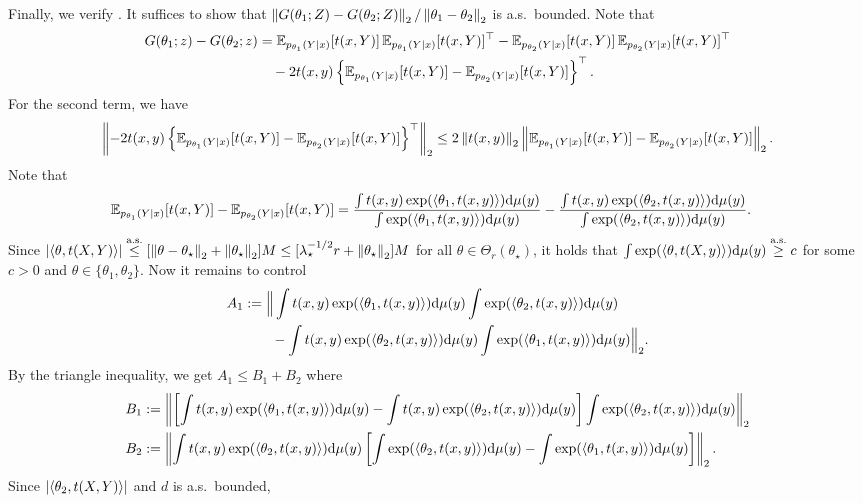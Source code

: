 \begin{example}
    Finally, we verify .
    It suffices to show that $\left\lVert G(\theta_1; Z) - G(\theta_2; Z) \right\rVert_2 / \left\lVert \theta_1 - \theta_2 \right\rVert_2$ is a.s.~bounded.
    Note that
    \begin{align*}
        G(\theta_1; z) - G(\theta_2; z)
        &= \operatorname{\mathbb E}_{p_{\theta_1}(Y \mid x)}[t(x, Y)] \operatorname{\mathbb E}_{p_{\theta_1}(Y \mid x)}[t(x, Y)]^\top - \operatorname{\mathbb E}_{p_{\theta_2}(Y \mid x)}[t(x, Y)] \operatorname{\mathbb E}_{p_{\theta_2}(Y \mid x)}[t(x, Y)]^\top \\
        &\quad - 2t(x, y)\left\{ \operatorname{\mathbb E}_{p_{\theta_1}(Y \mid x)}[t(x, Y)] - \operatorname{\mathbb E}_{p_{\theta_2}(Y \mid x)}[t(x, Y)] \right\}^\top.
    \end{align*}
    For the second term, we have
    \begin{align*}
        \left\lVert -2t(x, y)\left\{ \operatorname{\mathbb E}_{p_{\theta_1}(Y \mid x)}[t(x, Y)] - \operatorname{\mathbb E}_{p_{\theta_2}(Y \mid x)}[t(x, Y)] \right\}^\top \right\rVert_2
        \le 2\left\lVert t(x, y) \right\rVert_2 \left\lVert \operatorname{\mathbb E}_{p_{\theta_1}(Y \mid x)}[t(x, Y)] - \operatorname{\mathbb E}_{p_{\theta_2}(Y \mid x)}[t(x, Y)] \right\rVert_2.
    \end{align*}
    Note that
    \begin{align*}
        \operatorname{\mathbb E}_{p_{\theta_1}(Y \mid x)}[t(x, Y)] - \operatorname{\mathbb E}_{p_{\theta_2}(Y \mid x)}[t(x, Y)]
        &= \frac{\int t(x, y) \exp({\langle \theta_1, t(x, y) \rangle}) \mathrm{d} \mu(y)}{\int \exp({\langle \theta_1, t(x, y) \rangle}) \mathrm{d} \mu(y)} - \frac{\int t(x, y) \exp({\langle \theta_2, t(x, y) \rangle}) \mathrm{d} \mu(y)}{\int \exp({\langle \theta_2, t(x, y) \rangle}) \mathrm{d} \mu(y)}.
    \end{align*}
    Since $\left| {\langle \theta, t(X, Y) \rangle} \right| \overset{\mbox{\scriptsize a.s.}}{\le} [\left\lVert \theta - \theta_\star \right\rVert_2 + \left\lVert \theta_\star \right\rVert_2]M \le [\lambda_\star^{-1/2} r + \left\lVert \theta_\star \right\rVert_2] M$ for all $\theta \in \Theta_{r}(\theta_\star)$, it holds that $\int \exp({\langle \theta, t(X, y) \rangle}) \mathrm{d} \mu(y) \overset{\mbox{\scriptsize a.s.}}{\ge} c$ for some $c > 0$ and $\theta \in \{\theta_1, \theta_2\}$.
    Now it remains to control
    \begin{align*}
        A_1 &:= \Big \Vert \int t(x, y) \exp({\langle \theta_1, t(x, y) \rangle}) \mathrm{d} \mu(y) \int \exp({\langle \theta_2, t(x, y) \rangle}) \mathrm{d} \mu(y) \\
        &\qquad - \int t(x, y) \exp({\langle \theta_2, t(x, y) \rangle}) \mathrm{d} \mu(y) \int \exp({\langle \theta_1, t(x, y) \rangle}) \mathrm{d} \mu(y) \Big \Vert_2.
    \end{align*}
    By the triangle inequality, we get $A_1 \le B_1 + B_2$ where
    \begin{align*}
        B_1 &:= \left\lVert \left[\int t(x, y) \exp({\langle \theta_1, t(x, y) \rangle}) \mathrm{d} \mu(y) - \int t(x, y) \exp({\langle \theta_2, t(x, y) \rangle}) \mathrm{d} \mu(y) \right] \int \exp({\langle \theta_2, t(x, y) \rangle}) \mathrm{d} \mu(y) \right\rVert_2 \\
        B_2 &:= \left\lVert \int t(x, y) \exp({\langle \theta_2, t(x, y) \rangle}) \mathrm{d} \mu(y) \left[ \int \exp({\langle \theta_2, t(x, y) \rangle}) \mathrm{d} \mu(y) - \int \exp({\langle \theta_1, t(x, y) \rangle}) \mathrm{d} \mu(y) \right] \right\rVert_2.
    \end{align*}
    Since $\left| {\langle \theta_2, t(X, Y) \rangle} \right|$ and $d$ is a.s.~bounded, 
\end{example}

